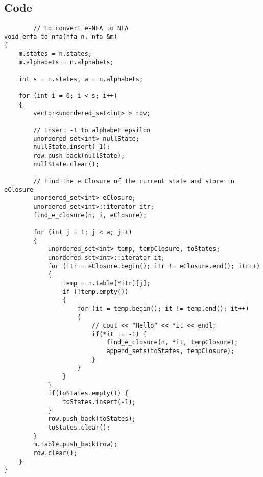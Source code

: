 \documentclass[a4paper, 12pt]{report}
\begin{document}
    \subsection{Code} 
    \begin{verbatim}
        // To convert e-NFA to NFA
void enfa_to_nfa(nfa n, nfa &m)
{
    m.states = n.states;
    m.alphabets = n.alphabets;

    int s = n.states, a = n.alphabets;

    for (int i = 0; i < s; i++)
    {
        vector<unordered_set<int> > row;

        // Insert -1 to alphabet epsilon
        unordered_set<int> nullState;
        nullState.insert(-1);
        row.push_back(nullState);
        nullState.clear();

        // Find the e Closure of the current state and store in eClosure
        unordered_set<int> eClosure;
        unordered_set<int>::iterator itr;
        find_e_closure(n, i, eClosure);

        for (int j = 1; j < a; j++)
        {
            unordered_set<int> temp, tempClosure, toStates;
            unordered_set<int>::iterator it;
            for (itr = eClosure.begin(); itr != eClosure.end(); itr++)
            {
                temp = n.table[*itr][j];
                if (!temp.empty())
                {
                    for (it = temp.begin(); it != temp.end(); it++)
                    {
                        // cout << "Hello" << *it << endl;
                        if(*it != -1) {
                            find_e_closure(n, *it, tempClosure);
                            append_sets(toStates, tempClosure);
                        }
                    }
                }
            }
            if(toStates.empty()) {
                toStates.insert(-1);
            }
            row.push_back(toStates);
            toStates.clear();
        }
        m.table.push_back(row);
        row.clear();
    }
}
    \end{verbatim}
\end{document}
